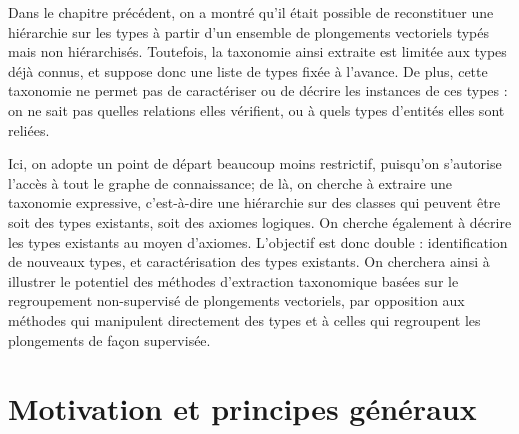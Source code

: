 \label{chap:texp}

Dans le chapitre précédent, on a montré qu'il était possible de reconstituer une hiérarchie sur les types à partir d'un ensemble de plongements vectoriels typés mais non hiérarchisés. Toutefois, la taxonomie ainsi extraite est limitée aux types déjà connus, et suppose donc une liste de types fixée à l'avance. De plus, cette taxonomie ne permet pas de caractériser ou de décrire les instances de ces types : on ne sait pas quelles relations elles vérifient, ou à quels types d'entités elles sont reliées.

Ici, on adopte un point de départ beaucoup moins restrictif, puisqu'on s'autorise l'accès à tout le graphe de connaissance; de là, on cherche à extraire une taxonomie expressive, c'est-à-dire une hiérarchie sur des classes qui peuvent être soit des types existants, soit des axiomes logiques. On cherche également à décrire les types existants au moyen d'axiomes. L'objectif est donc double : identification de nouveaux types, et caractérisation des types existants. On cherchera ainsi à illustrer le potentiel des méthodes d'extraction taxonomique basées sur le regroupement non-supervisé de plongements vectoriels, par opposition aux méthodes qui manipulent directement des types et à celles qui regroupent les plongements de façon supervisée.



\section{Motivation et principes généraux}

